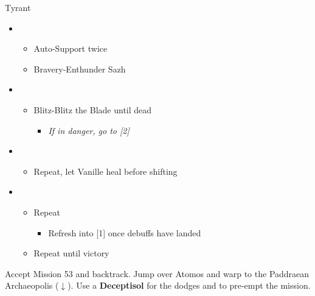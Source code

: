 \begin{battle}{Tyrant}
	\begin{itemize}
		\item \third
			\begin{itemize}
				\item Auto-Support twice
				\item Bravery-Enthunder Sazh
			\end{itemize}
		\item \fifth
			\begin{itemize}
				\item Blitz-Blitz the Blade until dead
					\begin{itemize}
						\item \textit{If in danger, go to [2]}
					\end{itemize}
			\end{itemize}
		\item \second
			\begin{itemize}
				\item Repeat, let Vanille heal before shifting
			\end{itemize}
		\item \fifth
			\begin{itemize}
				\item Repeat
					\begin{itemize}
						\item Refresh into [1] once debuffs have landed
					\end{itemize}
				\item Repeat until victory
			\end{itemize}
	\end{itemize}
\end{battle}

Accept Mission 53 and backtrack.
Jump over Atomos and warp to the Paddraean Archaeopolis ($\downarrow$).
Use a \textbf{Deceptisol} for the dodges and to pre-empt the mission.

